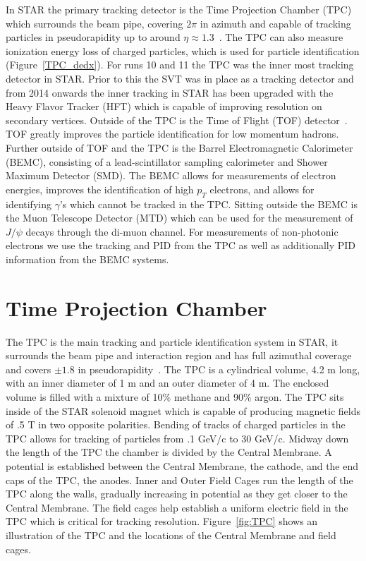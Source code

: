 In STAR the primary tracking detector is the Time Projection Chamber (TPC) which surrounds the beam pipe, covering $2\pi$ in azimuth and capable of tracking particles in pseudorapidity up to around $\eta \approx 1.3$~\cite{tpcNIM}. The TPC can also measure ionization energy loss of charged particles, which is used for particle identification (Figure~\ref{TPC_dedx}). For runs 10 and 11 the TPC was the inner most tracking detector in STAR. Prior to this the SVT was in place as a tracking detector and from 2014 onwards the inner tracking in STAR has been upgraded with the Heavy Flavor Tracker (HFT) which is capable of improving resolution on secondary vertices. Outside of the TPC is the Time of Flight (TOF) detector~\cite{vpdNIM}. TOF greatly improves the particle identification for low momentum hadrons. Further outside of TOF and the TPC is the Barrel Electromagnetic Calorimeter (BEMC), consisting of a lead-scintillator sampling calorimeter and Shower Maximum Detector (SMD). The BEMC allows for measurements of electron energies, improves the identification of high $p_T$ electrons, and allows for identifying $\gamma$'s which cannot be tracked in the TPC. Sitting outside the BEMC is the Muon Telescope Detector (MTD) which can be used for the measurement of $J/\psi$ decays through the di-muon channel. For measurements of non-photonic electrons we use the tracking and PID from the TPC as well as additionally PID information from the BEMC systems.

\section{Time Projection Chamber}

The TPC is the main tracking and particle identification system in STAR, it surrounds the beam pipe and interaction region and has full azimuthal coverage and covers $\pm 1.8$ in pseudorapidity~\cite{tpcNIM}. The TPC is a cylindrical volume, 4.2 m long, with an inner diameter of 1 m and an outer diameter of 4 m. The enclosed volume is filled with a mixture of 10\% methane and 90\% argon. The TPC sits inside of the STAR solenoid magnet which is capable of producing magnetic fields of .5 T in two opposite polarities. Bending of tracks of charged particles in the TPC allows for tracking of particles from .1 GeV/c to 30 GeV/c. Midway down the length of the TPC the chamber is divided by the Central Membrane. A potential is established between the Central Membrane, the cathode, and the end caps of the TPC, the anodes. Inner and Outer Field Cages run the length of the TPC along the walls, gradually increasing in potential as they get closer to the Central Membrane. The field cages help establish a uniform electric field in the TPC which is critical for tracking resolution. Figure~\ref{fig:TPC} shows an illustration of the TPC and the locations of the Central Membrane and field cages.

